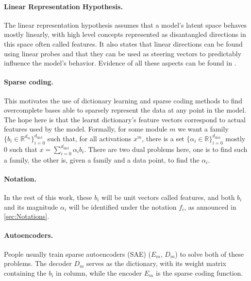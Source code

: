 \documentclass{article}
\newcommand{\R}{\mathbb{R}}
\begin{document}
\paragraph{Linear Representation Hypothesis.} The linear representation hypothesis assumes that a model's latent space behaves mostly linearly, with high level concepts represented as disantangled directions in this space often called features. It also states that linear directions can be found using linear probes and that they can be used as steering vectors to predictably influence the model's behavior. Evidence of all these aspects can be found in \citet{park2023linear, NIPS2013_9aa42b31, pennington2014glove, nanda2023emergent, gurnee2024language, wang2024conceptSteering, turner2024activationSteering}.

\paragraph{Sparse coding.} This motivates the use of dictionary learning and sparse coding methods to find overcomplete bases able to sparsely represent the data at any point in the model. The hope here is that the learnt dictionary's feature vectors correspond to actual features used by the model. Formally, for some module $m$ we want a family $\{b_i \in \R^{d_{m}}\}_{i=0}^{d_{\mathrm{dict}}}$ such that, for all activations $x^m$, there is a set $\{\alpha_i \in \R\}_{i=0}^{d_{\mathrm{dict}}}$ mostly 0 such that $x = \sum_{i=0}^{d_{\mathrm{dict}}} \alpha_i b_i$. There are two dual problems here, one is to find such a family, the other is, given a family and a data point, to find the $\alpha_i$.

\paragraph{Notation.} In the rest of this work, these $b_i$ will be unit vectors called features, and both $b_i$ and its magnitude $\alpha_i$ will be identified under the notation $f_i$, as announced in \cref{sec:Notations}.

\paragraph{Autoencoders.} People usually train sparse autoencoders (SAE) ($E_m$, $D_m$) to solve both of these problems. The decoder $D_m$ serves as the dictionary, with its weight matrix containing the $b_i$ in column, while the encoder $E_m$ is the sparse coding function.
\end{document}
